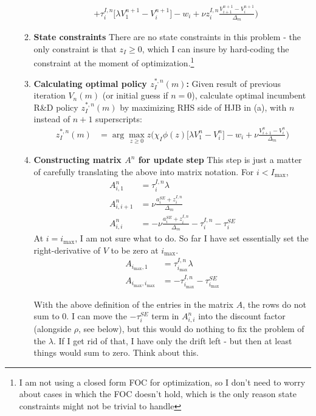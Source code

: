 \documentclass[12pt,english]{article}
\theoremstyle{remark}
\begin{document}
\begin{enumerate}
\begin{enumerate}
\begin{align*}
					  &+ \tau^{I,n}_i \big[ \lambda V^{n+1}_1 - V^{n+1}_i \big] - w_i + \nu z_i^{I,n} \frac{V_{i+1}^{n+1} - V_i^{n+1}}{\Delta_m} \Big)			
		\end{align*}
		\item \textbf{State constraints} There are no state constraints in this problem - the only constraint is that $z_I \ge 0$, which I can insure by hard-coding the constraint at the moment of optimization.\footnote{I am not using a closed form FOC for optimization, so I don't need to worry about cases in which the FOC doesn't hold, which is the only reason state constraints might not be trivial to handle}
		\item \textbf{Calculating optimal policy $z_I^{*,n}(m)$:} Given result of previous iteration $V_n(m)$ (or initial guess if $n = 0$), calculate optimal incumbent R\&D policy $z_I^{*,n}(m)$ by maximizing RHS side of HJB in (a), with $n$ instead of $n+1$ superscripts:
		\begin{align*}
			z_I^{*,n} (m) &= \arg \max_{z \ge 0}  z \Big( \chi_I \phi(z) \big[ \lambda V^n_1 - V^n_i \big] - w_i + \nu \frac{V_{i+1}^n - V_i^n}{\Delta_m} \Big)
		\end{align*} 
		\item \textbf{Constructing matrix $A^n$ for update step} This step is just a matter of carefully translating the above into matrix notation. For $i < I_{\max}$, 
		\begin{align*}
			A_{i,1}^n &= \tau^{I,n}_i \lambda \\
			A_{i,i+1}^n &= \nu \frac{a^{SE}_i + z^{I,n}_i}{\Delta_m} \\
			A_{i,i}^n &= -\nu \frac{a^{SE}_i + z^{I,n}_i}{\Delta_m} - \tau^{I,n}_i - \tau^{SE}_i 
		\end{align*} 
		At $i = i_{\max}$, I am not sure what to do. So far I have set essentially set the right-derivative of $V$ to be zero at $i_{\max}$.
		\begin{align*}
			A_{i_{\max},1} &= \tau^{I,n}_{i_{\max}} \lambda \\
			A_{i_{\max},i_{\max}} &= - \tau^{I,n}_{i_{\max}} - \tau^{SE}_{i_{\max}}
		\end{align*}
		
		\remark With the above definition of the entries in the matrix $A$, the rows do not sum to 0. I can move the $-\tau_i^{SE}$ term in $A_{i,i}^n$ into the discount factor (alongside $\rho$, see below), but this would do nothing to fix the problem of the $\lambda$. If I get rid of that, I have only the drift left - but then at least things would sum to zero. Think about this. 
		

\end{enumerate}
\end{enumerate}
\end{document}
